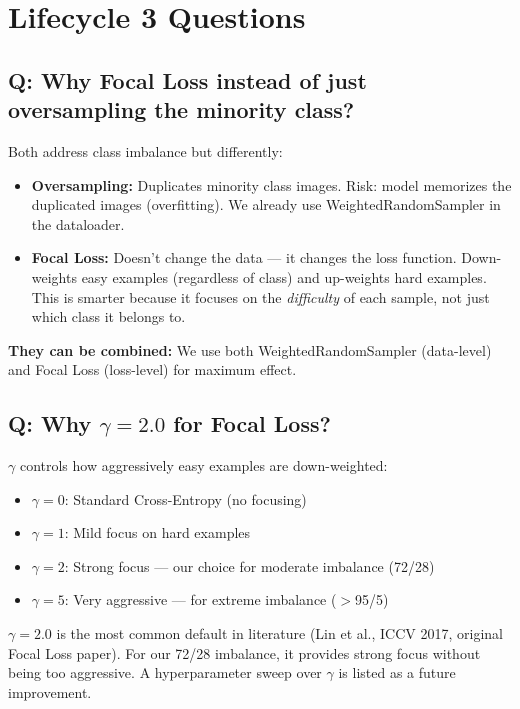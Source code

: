 \documentclass[11pt]{article}
\begin{document}
\section{Lifecycle 3 Questions}

\subsection{Q: Why Focal Loss instead of just oversampling the minority class?}

Both address class imbalance but differently:

\begin{itemize}[noitemsep]
    \item \textbf{Oversampling:} Duplicates minority class images. Risk: model memorizes the duplicated images (overfitting). We already use WeightedRandomSampler in the dataloader.
    \item \textbf{Focal Loss:} Doesn't change the data --- it changes the loss function. Down-weights easy examples (regardless of class) and up-weights hard examples. This is smarter because it focuses on the \textit{difficulty} of each sample, not just which class it belongs to.
\end{itemize}

\textbf{They can be combined:} We use both WeightedRandomSampler (data-level) and Focal Loss (loss-level) for maximum effect.

\subsection{Q: Why $\gamma = 2.0$ for Focal Loss?}

$\gamma$ controls how aggressively easy examples are down-weighted:

\begin{itemize}[noitemsep]
    \item $\gamma = 0$: Standard Cross-Entropy (no focusing)
    \item $\gamma = 1$: Mild focus on hard examples
    \item $\gamma = 2$: Strong focus --- our choice for moderate imbalance (72/28)
    \item $\gamma = 5$: Very aggressive --- for extreme imbalance ($>$95/5)
\end{itemize}

$\gamma = 2.0$ is the most common default in literature (Lin et al., ICCV 2017, original Focal Loss paper). For our 72/28 imbalance, it provides strong focus without being too aggressive. A hyperparameter sweep over $\gamma$ is listed as a future improvement.
\end{document}
